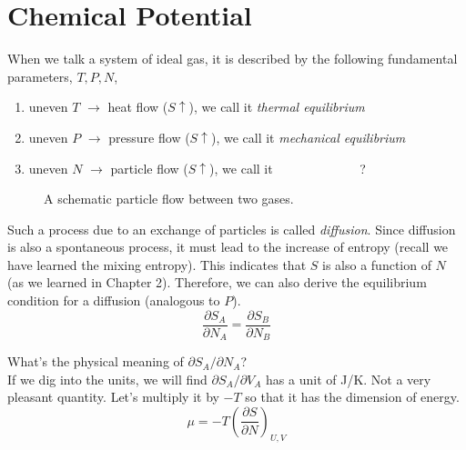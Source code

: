 

\section{Chemical Potential}
When we talk a system of ideal gas, it is described by the following fundamental parameters, $T,P,N$,
\begin{enumerate}
\item uneven $T$ $\rightarrow$ heat     flow ($S \uparrow$), we call it {\it thermal equilibrium}
\item uneven $P$ $\rightarrow$ pressure flow ($S \uparrow$), we call it {\it mechanical equilibrium}
\item uneven $N$ $\rightarrow$ particle flow ($S \uparrow$), we call it ~~~~~~~~~~~~~?
\end{enumerate}
\begin{figure}[h]
\centering
{}
\caption{A schematic particle flow between two gases.}
\end{figure}

Such a process due to an exchange of particles is called {\it diffusion}. Since diffusion is also a
spontaneous process, it must lead to the increase of entropy (recall we have learned the mixing entropy).
This indicates that $S$ is also a function of $N$ (as we learned in Chapter 2).
Therefore, we can also derive the equilibrium condition for a diffusion (analogous to $P$).
\begin{equation} \label{entropy} 
\frac {\partial{S_A}} {\partial{N_A}} =  \frac {\partial{S_B}} {\partial{N_B}} 
\end{equation}

What's the physical meaning of $\partial{S_A}/\partial{N_A}$? \\
If we dig into the units, we will find $\partial{S_A}/\partial{V_A}$ has a unit of J/K. 
Not a very pleasant quantity. Let's multiply it by $-T$ so that it has the dimension of energy.
\begin{equation} \label{entropy} 
\mu = -T (\frac {\partial{S}} {\partial{N}})_{U,V}
\end{equation}

